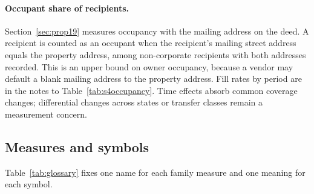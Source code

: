 \paragraph{Occupant share of recipients.} Section~\ref{sec:prop19} measures occupancy with the mailing address on the deed. A recipient is counted as an occupant when the recipient's mailing street address equals the property address, among non-corporate recipients with both addresses recorded. This is an upper bound on owner occupancy, because a vendor may default a blank mailing address to the property address. Fill rates by period are in the notes to Table~\ref{tab:s4occupancy}. Time effects absorb common coverage changes; differential changes across states or transfer classes remain a measurement concern.

\subsection{Measures and symbols}\label{app:glossary}

Table~\ref{tab:glossary} fixes one name for each family measure and one meaning for each symbol.

